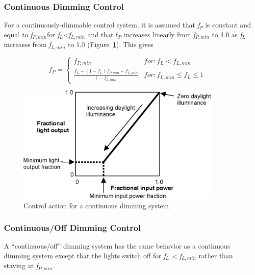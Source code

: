 \subsubsection{Continuous Dimming Control}\label{continuous-dimming-control}

For a continuously-dimmable control system, it is assumed that \emph{f\(_{P}\)} is constant and equal to \emph{f\(_{P,min}\)}for \emph{f\(_{L}\)\textless{}f\(_{L,min}\)} and that f\(_{P}\) increases linearly from \emph{f\(_{P,min}\)} to 1.0 as \emph{f\(_{L}\)} increases from \emph{f\(_{L,min}\)} to 1.0 (Figure~\ref{fig:control-action-for-a-continuous-dimming}). This gives

\begin{equation}
  f_P = \left\{
          \begin{array}{cl}
            f_{P,min} & for: f_L < f_{L,min} \\
            \frac{f_L + (1 - f_L)f_{P,min} - f_{L,min}}{1 - f_{L,min}} & for: f_{L,min} \le f_L \le 1
          \end{array}
        \right.
\end{equation}

\begin{figure}[hbtp] %
\centering
\includegraphics[width=0.9\textwidth, height=0.9\textheight, keepaspectratio=true]{media/image823.png}
\caption{Control action for a continuous dimming system. \protect \label{fig:control-action-for-a-continuous-dimming}}
\end{figure}

\subsubsection{Continuous/Off Dimming Control}\label{continuousoff-dimming-control}

A ``continuous/off'' dimming system has the same behavior as a continuous dimming system except that the lights switch off for \emph{f\(_{L}\) \textless{} f\(_{L,min}\)} rather than staying at \emph{f\(_{P,min}\)}.


